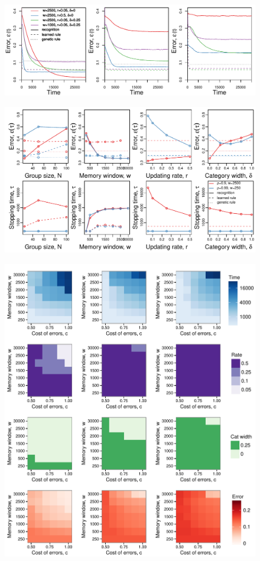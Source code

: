 \clearpage
\setcounter{figure}{0}
\begin{figure}
\includegraphics[width=.95\textwidth]{figures/learning_curves.pdf}
\caption{}
\end{figure}


\begin{figure}
\includegraphics[width=6.85in]{figures/parameters_exploration.pdf}
\caption{}
\end{figure}


\begin{figure}
\includegraphics[width=6.85in]{figures/strategies_heat_maps.pdf}
\caption{}
\end{figure}

